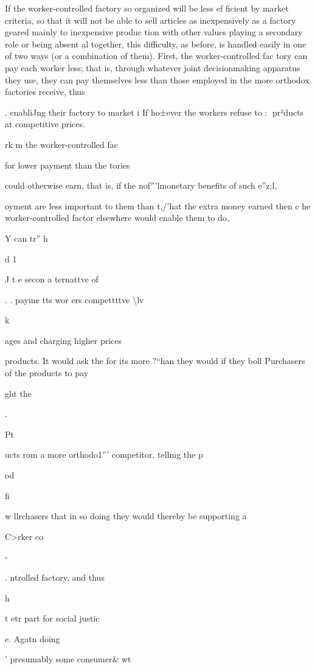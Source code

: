 \documentclass[11pt,openany]{book}
\begin{document}
If the worker-controlled factory so organized will be less ef ficient by market criteria, so that it will not be able to sell articles as inexpensively as a factory geared mainly to inexpensive produc tion with other values playing a secondary role or being absent al together, this difficulty, as before, is handled easily in one of two ways (or a combination of them). First, the worker-controlled fac tory can pay each worker less; that is, through whatever joint decisionmaking apparatus they use, they can pay themselves less than those employed in the more orthodox factories receive, thus 

. enabliJng their factory to market i If ho±ever the workers refuse to : pr²ducts at competitive prices. 

rk m the worker-controlled fac

for lower payment than the tories 

could otherwise earn, that is, if the nof'''lmonetary benefits of such e''z;l, 

oyment are less important to them than t,/'hat the extra money earned then c he worker-controlled factor elsewhere would enable them to do, 

Y can tr'' h 

d 1 

J t e secon a ternattve of 

. . payin¢ tts wor ers compettttve \textbackslash{}lv 

k 

ages and charging higher prices 

products. It would ask the for its more ?``han they would if they boll Purchasers of the products to pay 

ght the 

. 

Pt 

ucts rom a more orthodo1''' competitor, tellmg the p 

od 

fi 

w llrchasers that in so doing they would thereby be supporting a 

C>rker co 

-

. ntrolled factory, and thus 

h 

t etr part for social justic 

e. Agatn doing 

' presumably some consumer\& wt 
\end{document}
